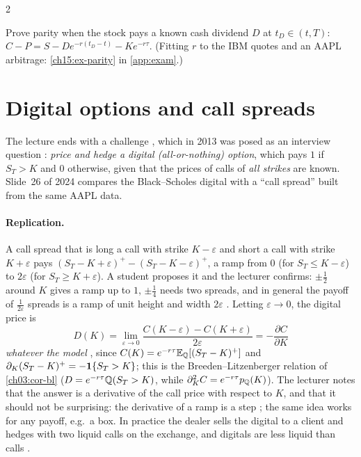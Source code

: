 \begin{paracol}{2}
\begin{exercise}\label{ch15:ex-parity-short}
Prove parity when the stock pays a known cash dividend $D$ at $t_D\in(t,T)$: $C-P=S-De^{-r(t_D-t)}-Ke^{-r\tau}$. (Fitting $r$ to the IBM quotes and an AAPL arbitrage: \cref{ch15:ex-parity} in \cref{app:exam}.)
\end{exercise}

\section{Digital options and call spreads}\label{ch15:sec-digital}
The lecture ends with a challenge , which in 2013 was posed as an interview question : \emph{price and hedge a digital (all-or-nothing) option}, which pays $1$
if $S_T>K$ and $0$ otherwise, given that the prices of calls of \emph{all strikes} are known. Slide~26 of 2024 compares the Black--Scholes digital with a ``call spread'' built from the same
AAPL data.

\paragraph{Replication.} A call spread that is long a call with strike $K-\varepsilon$ and short a call with strike $K+\varepsilon$ pays
$(S_T-K+\varepsilon)^+-(S_T-K-\varepsilon)^+$, a ramp from $0$ (for $S_T\le K-\varepsilon$) to $2\varepsilon$ (for $S_T\ge K+\varepsilon$). A student proposes it and the lecturer confirms:
$\pm\tfrac12$ around $K$ gives a ramp up to $1$, $\pm\tfrac14$ needs two spreads, and in general the payoff of $\frac1{2\varepsilon}$ spreads is a ramp of unit height and width $2\varepsilon$
. Letting $\varepsilon\to0$, the digital price is
\begin{equation}\label{ch15:eq-digital-limit}
  D(K)=\lim_{\varepsilon\to0}\frac{C(K-\varepsilon)-C(K+\varepsilon)}{2\varepsilon}=-\frac{\partial C}{\partial K}
\end{equation}
\emph{whatever the model} , since $C(K)=e^{-r\tau}\mathbb{E}_{\mathbb{Q}}[(S_T-K)^+]$ and $\partial_K(S_T-K)^+=-\mathbf{1}\{S_T>K\}$; this is the Breeden--Litzenberger relation of \cref{ch03:cor-bl} ($D=e^{-r\tau}\mathbb{Q}(S_T>K)$, while $\partial^2_KC=e^{-r\tau}p_{\mathbb{Q}}(K)$). The lecturer notes that the answer is a
derivative of the call price with respect to $K$, and that it should not be surprising: the derivative of a ramp is a step ; the same idea works for any payoff, e.g.\ a box. In practice the dealer
sells the digital to a client and hedges with two liquid calls on the exchange, and digitals are less liquid than calls .


\end{paracol}
